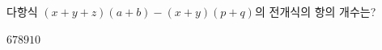 다항식 $(x+y+z)(a+b)-(x+y)(p+q)$의 전개식의 항의 개수는?
\begin{choices32}{$6$}{$7$}{$8$}{$9$}{$10$}\end{choices32}
